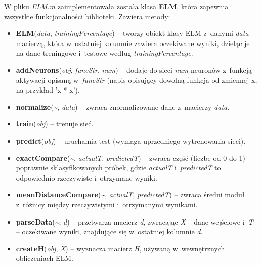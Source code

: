 \documentclass{article}
\begin{document}
W pliku \textit{ELM.m} zaimplementowała została klasa \textbf{ELM}, która zapewnia wszystkie funkcjonalności biblioteki. Zawiera metody:
\begin{itemize}
\item \textbf{ELM}(\textit{data}, \textit{trainingPercentage}) -- tworzy obiekt klasy ELM z~danymi \textit{data} -- macierzą, która w~ostatniej kolumnie zawiera oczekiwane wyniki, dzieląc je na dane treningowe i~testowe według \textit{trainingPercentage}.
\item \textbf{addNeurons}(\textit{obj}, \textit{funcStr}, \textit{num}) -- dodaje do sieci \textit{num} neuronów z~funkcją aktywacji opisaną w~\textit{funcStr} (napis opisujący dowolną funkcja od zmiennej x, na przykład 'x * x').  
\item \textbf{normalize}(\textit{\~}, \textit{data}) -- zwraca znormalizowane dane z~macierzy \textit{data}.
\item \textbf{train}(\textit{obj}) -- trenuje sieć.
\item \textbf{predict}(\textit{obj}) -- uruchamia test (wymaga uprzedniego wytrenowania sieci).
\item \textbf{exactCompare}(\textit{\~}, \textit{actualT}, \textit{predictedT}) -- zwraca część (liczbę od 0 do 1) poprawnie sklasyfikowanych próbek, gdzie \textit{actualT} i~\textit{predictedT} to odpowiednio rzeczywiste i~otrzymane wyniki.
\item \textbf{meanDistanceCompare}(\textit{\~}, \textit{actualT}, \textit{predictedT}) -- zwraca średni moduł z~różnicy między rzeczywistymi i~otrzymanymi wynikami.
\item \textbf{parseData}(\textit{\~}, \textit{d}) -- przetwarza macierz \textit{d}, zwracając \textit{X} -- dane wejściowe i~\textit{T} -- oczekiwane wyniki, znajdujące się w~ostatniej kolumnie \textit{d}.
\item \textbf{createH}(\textit{obj}, \textit{X}) -- wyznacza macierz \textit{H}, używaną w~wewnętrznych obliczeniach ELM.
\end{itemize}
\end{document}
